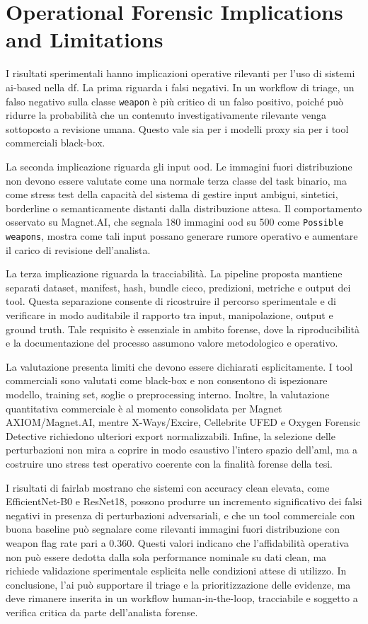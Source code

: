 \section{Operational Forensic Implications and Limitations}
\label{sec:results-implications}

I risultati sperimentali hanno implicazioni operative rilevanti per l'uso di
sistemi \gls{ai}-based nella \gls{df}. La prima riguarda i falsi negativi. In
un workflow di triage, un falso negativo sulla classe \texttt{weapon} è più
critico di un falso positivo, poiché può ridurre la probabilità che un contenuto
investigativamente rilevante venga sottoposto a revisione umana. Questo vale sia
per i modelli proxy sia per i tool commerciali black-box.

La seconda implicazione riguarda gli input \gls{ood}. Le immagini fuori
distribuzione non devono essere valutate come una normale terza classe del task
binario, ma come stress test della capacità del sistema di gestire input
ambigui, sintetici, borderline o semanticamente distanti dalla distribuzione
attesa. Il comportamento osservato su Magnet.AI, che segnala 180 immagini
\gls{ood} su 500 come \texttt{Possible weapons}, mostra come tali input possano
generare rumore operativo e aumentare il carico di revisione dell'analista.

La terza implicazione riguarda la tracciabilità. La pipeline proposta mantiene
separati dataset, manifest, hash, bundle cieco, predizioni, metriche e output
dei tool. Questa separazione consente di ricostruire il percorso sperimentale e
di verificare in modo auditabile il rapporto tra input, manipolazione, output e
ground truth. Tale requisito è essenziale in ambito forense, dove la
riproducibilità e la documentazione del processo assumono valore metodologico e
operativo.

La valutazione presenta limiti che devono essere dichiarati esplicitamente. I
tool commerciali sono valutati come black-box e non consentono di ispezionare
modello, training set, soglie o preprocessing interno. Inoltre, la valutazione
quantitativa commerciale è al momento consolidata per Magnet AXIOM/Magnet.AI,
mentre X-Ways/Excire, Cellebrite UFED e Oxygen Forensic Detective richiedono
ulteriori export normalizzabili. Infine, la selezione delle perturbazioni non
mira a coprire in modo esaustivo l'intero spazio dell'\gls{aml}, ma a costruire
uno stress test operativo coerente con la finalità forense della tesi.

I risultati di \gls{fairlab} mostrano che sistemi con accuracy clean elevata,
come EfficientNet-B0 e ResNet18, possono produrre un incremento significativo
dei falsi negativi in presenza di perturbazioni adversariali, e che un tool
commerciale con buona baseline può segnalare come rilevanti immagini fuori
distribuzione con weapon flag rate pari a 0.360. Questi valori indicano che
l'affidabilità operativa non può essere dedotta dalla sola performance nominale
su dati clean, ma richiede validazione sperimentale esplicita nelle condizioni
attese di utilizzo. In conclusione, l'\gls{ai} può supportare il triage e la
prioritizzazione delle evidenze, ma deve rimanere inserita in un workflow
human-in-the-loop, tracciabile e soggetto a verifica critica da parte
dell'analista forense.